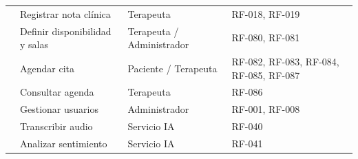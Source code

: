 \begin{longtable}{L{1.6cm} L{5cm} L{3.5cm} L{4cm}}
   & Registrar nota clínica & Terapeuta & RF-018, RF-019 \\
   & Definir disponibilidad y salas & Terapeuta / Administrador & RF-080, RF-081 \\
   & Agendar cita & Paciente / Terapeuta & RF-082, RF-083, RF-084, RF-085, RF-087 \\
   & Consultar agenda & Terapeuta & RF-086 \\
   & Gestionar usuarios & Administrador & RF-001, RF-008 \\
   & Transcribir audio & Servicio IA & RF-040 \\
   & Analizar sentimiento & Servicio IA & RF-041 \\
  \bottomrule
\end{longtable}